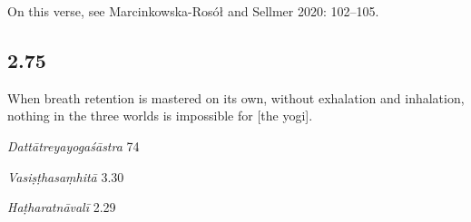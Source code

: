 \begin{ekdosis}
\begin{testimonia}[hp02_074]

\end{testimonia}

\begin{philcomm}[hp02_074]
On this verse, see Marcinkowska-Rosół and Sellmer 2020: 102–105.
\end{philcomm}

\subsection*{2.75}
\begin{translation}[hp02_075]
When breath retention is mastered on its own, without exhalation and inhalation, nothing in the three worlds  is impossible for [the yogi].
\end{translation}


\begin{sources}[hp02_075]
\emph{Dattātreyayogaśāstra} 74

\begin{versinnote}
\end{versinnote}

\emph{Vasiṣṭhasaṃhitā} 3.30

\begin{versinnote}
\end{versinnote}
\end{sources}

\begin{testimonia}[hp02_075]
\emph{Haṭharatnāvalī} 2.29


\end{testimonia}
\end{ekdosis}
